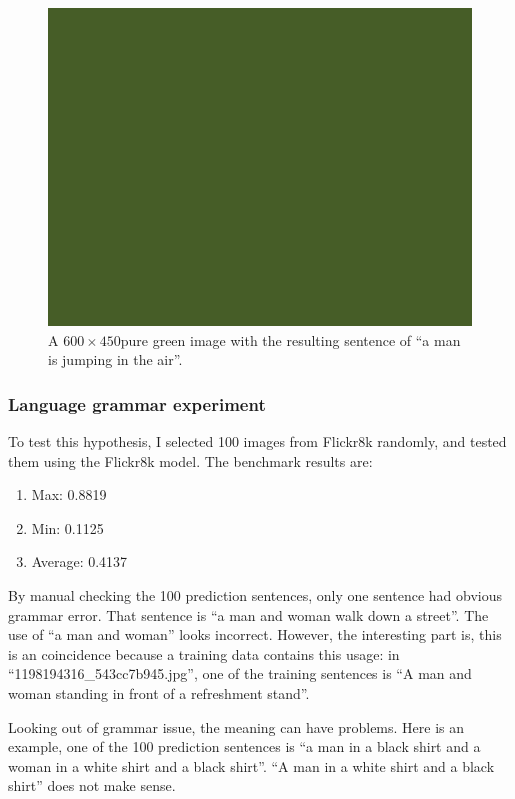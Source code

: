\documentclass[10pt,twocolumn,letterpaper]{article}
\begin{document}
\begin{figure}[t]
    \begin{center}
        \includegraphics[width=0.9\linewidth]{pure.jpg}
    \end{center}
    \caption{A $600 \times 450$pure green image with the resulting sentence of ``a man is jumping in the air''.}
    \label{fig:pure}
\end{figure}

\subsubsection{Language grammar experiment} \label{sec:lg}
To test this hypothesis, I selected 100 images from Flickr8k randomly, and tested them using the Flickr8k model.
The benchmark results are:
\begin{enumerate}
    \item Max: 0.8819
    \item Min: 0.1125
    \item Average: 0.4137
\end{enumerate}

By manual checking the 100 prediction sentences, only one sentence had obvious grammar error.
That sentence is ``a man and woman walk down a street''.
The use of ``a man and woman'' looks incorrect.
However, the interesting part is, this is an coincidence because a training data contains this usage:
in ``1198194316\_543cc7b945.jpg'', one of the training sentences is ``A man and woman standing in front of a refreshment stand''.

Looking out of grammar issue, the meaning can have problems.
Here is an example, one of the 100 prediction sentences is
``a man in a black shirt and a woman in a white shirt and a black shirt''.
``A man in a white shirt and a black shirt'' does not make sense.
\end{document}

